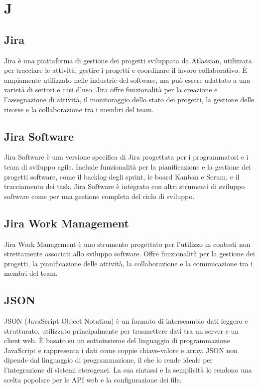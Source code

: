 \section{J}

\vspace{2em}
\subsection*{Jira}
\par Jira è una piattaforma di gestione dei progetti sviluppata da Atlassian, utilizzata per tracciare le attività, gestire i progetti e coordinare il lavoro collaborativo. È ampiamente utilizzato nelle industrie del software, ma può essere adattato a una varietà di settori e casi d'uso. Jira offre funzionalità per la creazione e l'assegnazione di attività, il monitoraggio dello stato dei progetti, la gestione delle risorse e la collaborazione tra i membri del team.

\vspace{2em}
\subsection*{Jira Software}
\par Jira Software è una versione specifica di Jira progettata per i programmatori e i team di sviluppo agile. Include funzionalità per la pianificazione e la gestione dei progetti software, come il backlog degli sprint, le board Kanban e Scrum, e il tracciamento dei task. Jira Software è integrato con altri strumenti di sviluppo software come  per una gestione completa del ciclo di sviluppo.

\vspace{2em}
\subsection*{Jira Work Management}
\par Jira Work Management è uno strumento progettato per l'utilizzo in contesti non strettamente associati allo sviluppo software. Offre funzionalità per la gestione dei progetti, la pianificazione delle attività, la collaborazione e la comunicazione tra i membri del team.

\vspace{2em}
\subsection*{JSON}
\par JSON (JavaScript Object Notation) è un formato di interscambio dati leggero e strutturato, utilizzato principalmente per trasmettere dati tra un server e un client web. È basato su un sottoinsieme del linguaggio di programmazione JavaScript e rappresenta i dati come coppie chiave-valore e array. JSON non dipende dal linguaggio di programmazione, il che lo rende ideale per l'integrazione di sistemi eterogenei. La sua sintassi e la semplicità lo rendono una scelta popolare per le API web e la configurazione dei file.

